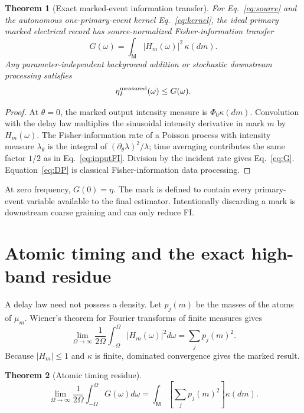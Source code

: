\documentclass[aps,prapplied,preprint,nofootinbib]{revtex4-2}
\newtheorem{theorem}{Theorem}
\newcommand{\M}{\mathsf M}
\begin{document}
\begin{theorem}[Exact marked-event information transfer]
For Eq.~\eqref{eq:source} and the autonomous one-primary-event kernel Eq.~\eqref{eq:kernel}, the ideal primary marked electrical record has source-normalized Fisher-information transfer
\begin{equation}
\boxed{
G(\omega)=\int_{\M}|H_m(\omega)|^2\,\kappa(dm).}
\label{eq:G}
\end{equation}
Any parameter-independent background addition or stochastic downstream processing satisfies
\begin{equation}
\eta_I^{\rm measured}(\omega)\le G(\omega).
\label{eq:DP}
\end{equation}
\end{theorem}

\begin{proof}
At $\theta=0$, the marked output intensity measure is $\Phi_0\kappa(dm)$. Convolution with the delay law multiplies the sinusoidal intensity derivative in mark $m$ by $H_m(\omega)$. The Fisher-information rate of a Poisson process with intensity measure $\lambda_\theta$ is the integral of $(\partial_\theta\lambda)^2/\lambda$; time averaging contributes the same factor $1/2$ as in Eq.~\eqref{eq:inputFI}. Division by the incident rate gives Eq.~\eqref{eq:G}. Equation~\eqref{eq:DP} is classical Fisher-information data processing.
\end{proof}

At zero frequency, $G(0)=\eta$. The mark is defined to contain every primary-event variable available to the final estimator. Intentionally discarding a mark is downstream coarse graining and can only reduce FI.

\section{Atomic timing and the exact high-band residue}

A delay law need not possess a density. Let $p_j(m)$ be the masses of the atoms of $\mu_m$. Wiener's theorem for Fourier transforms of finite measures \cite{Katznelson2004} gives
\begin{equation}
\lim_{\Omega\to\infty}\frac{1}{2\Omega}
\int_{-\Omega}^{\Omega}|H_m(\omega)|^2d\omega
=\sum_jp_j(m)^2.
\end{equation}
Because $|H_m|\le1$ and $\kappa$ is finite, dominated convergence gives the marked result.

\begin{theorem}[Atomic timing residue]
\begin{equation}
\boxed{
\lim_{\Omega\to\infty}\frac{1}{2\Omega}
\int_{-\Omega}^{\Omega}G(\omega)d\omega
=\int_{\M}\left[\sum_jp_j(m)^2\right]\kappa(dm).}
\label{eq:atomic}
\end{equation}
\end{theorem}
\end{document}
